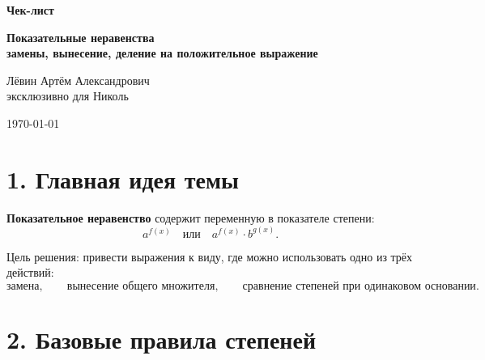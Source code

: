 \documentclass[a4paper,12pt]{article}
\newcommand{\sectionline}{\vspace{2mm}{\color{linegray}\hrule height 0.5pt}\vspace{2mm}}
\newcommand{\important}[1]{\textcolor{darkaccent}{\textbf{#1}}}
\begin{document}
\begin{titlepage}
\thispagestyle{empty}
\begin{center}
\vspace*{28mm}

{\Large \textcolor{darkaccent}{\textbf{Чек-лист}}}

\vspace{6mm}

{\huge \textbf{Показательные неравенства}}\\[2mm]
{\Large \textbf{замены, вынесение, деление на положительное выражение}}

\vspace{18mm}

{\large Лёвин Артём Александрович}\\[1mm]
{\large эксклюзивно для Николь}

\vspace{12mm}

{\large \today}

\vfill


\vspace{12mm}
\end{center}
\end{titlepage}

\setcounter{page}{2}

\section*{\textcolor{darkaccent}{1. Главная идея темы}}

\important{Показательное неравенство} содержит переменную в показателе степени:
\[
a^{f(x)} \quad \text{или} \quad a^{f(x)}\cdot b^{g(x)}.
\]

Цель решения: привести выражения к виду, где можно использовать одно из трёх действий:
\[
\text{замена}, \qquad
\text{вынесение общего множителя}, \qquad
\text{сравнение степеней при одинаковом основании}.
\]

\sectionline

\section*{\textcolor{darkaccent}{2. Базовые правила степеней}}
\end{document}
